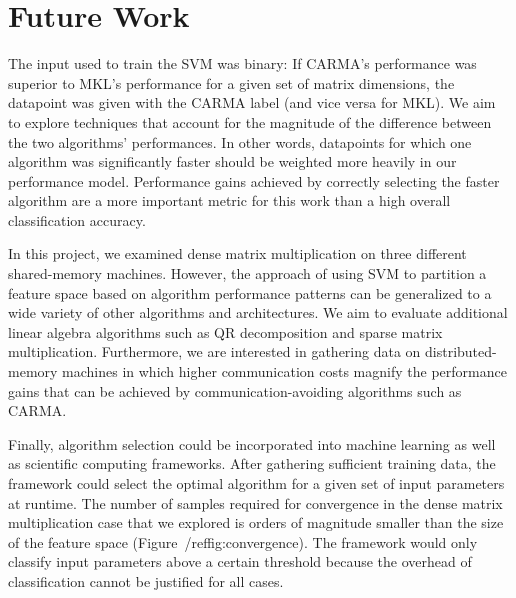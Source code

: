 \section{Future Work}
\label{s:future}

The input used to train the SVM was binary: If CARMA's performance was superior to MKL's performance for a given set of matrix dimensions, the datapoint was given with the CARMA label (and vice versa for MKL).
We aim to explore techniques that account for the magnitude of the difference between the two algorithms' performances.
In other words, datapoints for which one algorithm was significantly faster should be weighted more heavily in our performance model.
Performance gains achieved by correctly selecting the faster algorithm are a more important metric for this work than a high overall classification accuracy.

In this project, we examined dense matrix multiplication on three different shared-memory machines.
However, the approach of using SVM to partition a feature space based on algorithm performance patterns can be generalized to a wide variety of other algorithms and architectures.
We aim to evaluate additional linear algebra algorithms such as QR decomposition and sparse matrix multiplication.
Furthermore, we are interested in gathering data on distributed-memory machines in which higher communication costs magnify the performance gains that can be achieved by communication-avoiding algorithms such as CARMA.

Finally, algorithm selection could be incorporated into machine learning as well as scientific computing frameworks.
After gathering sufficient training data, the framework could select the optimal algorithm for a given set of input parameters at runtime.
The number of samples required for convergence in the dense matrix multiplication case that we explored is orders of magnitude smaller than the size of the feature space (Figure~/ref{fig:convergence}).
The framework would only classify input parameters above a certain threshold because the overhead of classification cannot be justified for all cases.
